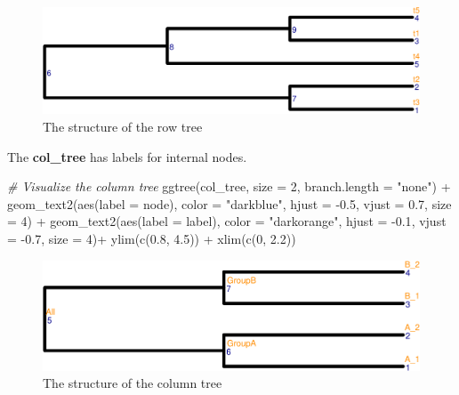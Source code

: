 \documentclass[]{article}
\newcommand{\hlnum}[1]{\textcolor[rgb]{0.816,0.125,0.439}{#1}}%
\newcommand{\hlstr}[1]{\textcolor[rgb]{0.251,0.627,0.251}{#1}}%
\newcommand{\hlcom}[1]{\textcolor[rgb]{0.502,0.502,0.502}{\textit{#1}}}%
\newcommand{\hlopt}[1]{\textcolor[rgb]{0,0,0}{#1}}%
\newcommand{\hlstd}[1]{\textcolor[rgb]{0.251,0.251,0.251}{#1}}%
\newcommand{\hlkwc}[1]{\textcolor[rgb]{0.251,0.251,0.251}{#1}}%
\newcommand{\hlkwd}[1]{\textcolor[rgb]{0.878,0.439,0.125}{#1}}%
\newenvironment{Shaded}{\begin{myshaded}}{\end{myshaded}}
\newcommand{\KeywordTok}[1]{\hlkwd{#1}}
\newcommand{\DataTypeTok}[1]{\hlkwc{#1}}
\newcommand{\DecValTok}[1]{\hlnum{#1}}
\newcommand{\FloatTok}[1]{\hlnum{#1}}
\newcommand{\StringTok}[1]{\hlstr{#1}}
\newcommand{\CommentTok}[1]{\hlcom{#1}}
\newcommand{\OperatorTok}[1]{\hlopt{#1}}
\newcommand{\NormalTok}[1]{\hlstd{#1}}
\begin{document}
\begin{figure}
\includegraphics{figure/rtree-1} \caption{\label{rtree} The structure of the row tree}\label{fig:rtree}
\end{figure}

The \textbf{col\_tree} has labels for internal nodes.

\begin{Shaded}
\begin{Highlighting}[]
\CommentTok{# Visualize the column tree}
\KeywordTok{ggtree}\NormalTok{(col_tree, }\DataTypeTok{size =} \DecValTok{2}\NormalTok{, }\DataTypeTok{branch.length =} \StringTok{"none"}\NormalTok{) }\OperatorTok{+}
\KeywordTok{geom_text2}\NormalTok{(}\KeywordTok{aes}\NormalTok{(}\DataTypeTok{label =}\NormalTok{ node), }\DataTypeTok{color =} \StringTok{"darkblue"}\NormalTok{,}
                \DataTypeTok{hjust =} \FloatTok{-0.5}\NormalTok{, }\DataTypeTok{vjust =} \FloatTok{0.7}\NormalTok{, }\DataTypeTok{size =} \DecValTok{4}\NormalTok{) }\OperatorTok{+}
\KeywordTok{geom_text2}\NormalTok{(}\KeywordTok{aes}\NormalTok{(}\DataTypeTok{label =}\NormalTok{ label), }\DataTypeTok{color =} \StringTok{"darkorange"}\NormalTok{,}
            \DataTypeTok{hjust =} \FloatTok{-0.1}\NormalTok{, }\DataTypeTok{vjust =} \FloatTok{-0.7}\NormalTok{, }\DataTypeTok{size =} \DecValTok{4}\NormalTok{)}\OperatorTok{+}
\StringTok{  }\KeywordTok{ylim}\NormalTok{(}\KeywordTok{c}\NormalTok{(}\FloatTok{0.8}\NormalTok{, }\FloatTok{4.5}\NormalTok{)) }\OperatorTok{+}
\StringTok{  }\KeywordTok{xlim}\NormalTok{(}\KeywordTok{c}\NormalTok{(}\DecValTok{0}\NormalTok{, }\FloatTok{2.2}\NormalTok{))}
\end{Highlighting}
\end{Shaded}

\begin{figure}
\includegraphics{figure/ctree-1} \caption{\label{ctree} The structure of the column tree}\label{fig:ctree}
\end{figure}
\end{document}
